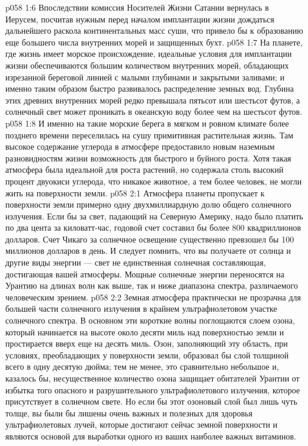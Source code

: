 \vs p058 1:6 Впоследствии комиссия Носителей Жизни Сатании вернулась в Иерусем, посчитав нужным перед началом имплантации жизни дождаться дальнейшего раскола континентальных масс суши, что привело бы к образованию еще большего числа внутренних морей и защищенных бухт.
\vs p058 1:7 \pc На планете, где жизнь имеет морское происхождение, идеальные условия для имплантации жизни обеспечиваются большим количеством внутренних морей, обладающих изрезанной береговой линией с малыми глубинами и закрытыми заливами; и именно таким образом быстро развивалось распределение земных вод. Глубина этих древних внутренних морей редко превышала пятьсот или шестьсот футов, а солнечный свет может проникать в океанскую воду более чем на шестьсот футов.
\vs p058 1:8 И именно на такие морские берега в мягком и ровном климате более позднего времени переселилась на сушу примитивная растительная жизнь. Там высокое содержание углерода в атмосфере предоставило новым наземным разновидностям жизни возможность для быстрого и буйного роста. Хотя такая атмосфера была идеальной для роста растений, но содержала столь высокий процент двуокиси углерода, что никакое животное, а тем более человек, не могли жить на поверхности земли.
\vs p058 2:1 Атмосфера планеты пропускает к поверхности земли примерно одну двухмиллиардную долю общего солнечного излучения. Если бы за свет, падающий на Северную Америку, надо было платить по два цента за киловатт\hyp{}час, годовой счет составил бы более 800 квадриллионов долларов. Счет Чикаго за солнечное освещение существенно превзошел бы 100 миллионов долларов в день. И следует помнить, что вы получаете от солнца и другие виды энергии --- свет не единственная солнечная составляющая, достигающая вашей атмосферы. Мощные солнечные энергии переносятся на Урантию на длинах волн как выше, так и ниже диапазона спектра, различаемого человеческим зрением.
\vs p058 2:2 \pc Земная атмосфера практически не прозрачна для большей части солнечного излучения в крайнем ультрафиолетовом участке солнечного спектра. В основном эти короткие волны поглощаются слоем озона, который начинается на высоте около десяти миль над поверхностью земли и простирается вверх еще на десять миль. Озон, заполняющий эту область, при условиях, преобладающих у поверхности земли, образовал бы слой толщиной всего в одну десятую дюйма; тем не менее, это сравнительно небольшое и, казалось бы, несущественное количество озона защищает обитателей Урантии от избытка того опасного и разрушительного ультрафиолетового излучения, которое присутствует в солнечном свете. Но если бы этот озоновый слой был лишь чуть толще, вы были бы лишены очень важных и полезных для здоровья ультрафиолетовых лучей, которые достигают сейчас земной поверхности и являются основой для выработки одного из ваших наиболее важных витаминов.
